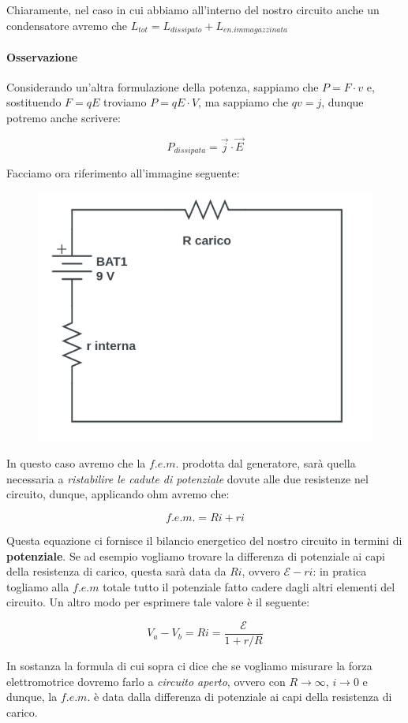 Chiaramente, nel caso in cui abbiamo all'interno del nostro circuito anche un condensatore avremo che $L_{tot} = L_{dissipato} + L_{en.immagazzinata}$


\paragraph{Osservazione} Considerando un'altra formulazione della potenza, sappiamo che $P = F\cdot v$ e, sostituendo $F = qE$ troviamo $P = qE \cdot V$, ma sappiamo che $qv = j$, dunque potremo anche scrivere: 

$$ P_{dissipata} = \vec{j} \cdot \vec{E} $$

Facciamo ora riferimento all'immagine seguente: 

\begin{figure}[th]
	\centering
	\includegraphics[width=0.5\linewidth]{Media/circuito_1}
	\label{fig:circuito1}
\end{figure}

In questo caso avremo che la $f.e.m.$ prodotta dal generatore, sarà quella necessaria a \textit{ristabilire le cadute di potenziale }dovute alle due resistenze nel circuito, dunque, applicando ohm avremo che: 

\begin{equation} \label{eq_bilancio_potenziale}
f.e.m. = Ri + ri 
\end{equation}

Questa equazione ci fornisce il bilancio energetico del nostro circuito in termini di \textbf{potenziale}.
Se ad esempio vogliamo trovare la differenza di potenziale ai capi della resistenza di carico, questa sarà data da $Ri$, ovvero $\mathcal{E} - ri$: in pratica togliamo alla $f.e.m$ totale tutto il potenziale fatto cadere dagli altri elementi del circuito. Un altro modo per esprimere tale valore è il seguente: 

$$V_a - V_b = Ri = \frac{\mathcal{E}}{1 + r/R} $$

In sostanza la formula di cui sopra ci dice che se vogliamo misurare la forza elettromotrice dovremo farlo a \textit{circuito aperto}, ovvero con $R \rightarrow \infty$, $i \rightarrow 0$ e dunque, la $f.e.m.$ è data dalla differenza di potenziale ai capi della resistenza di carico. 

